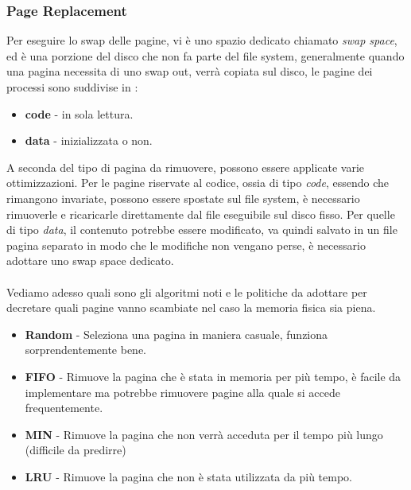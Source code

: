 \documentclass[12pt, letterpaper]{article}
\newcommand{\acc}{\\\hphantom{}\\}
\begin{document}
\subsubsection{Page Replacement} 
Per  eseguire lo swap delle pagine, vi è uno spazio dedicato chiamato \textit{swap space}, ed è una porzione del disco 
che non fa parte del file system, generalmente quando una pagina necessita di uno swap out, verrà copiata sul disco, le 
pagine dei processi sono suddivise in :\begin{itemize}
    \item \textbf{code} - in sola lettura.
    \item \textbf{data} - inizializzata o non.
\end{itemize}
A seconda del tipo di pagina da rimuovere, possono essere applicate varie ottimizzazioni. Per le pagine riservate al 
codice, ossia di tipo \textit{code}, essendo che rimangono invariate, possono essere spostate sul file system, è necessario 
rimuoverle e ricaricarle direttamente dal file eseguibile sul disco fisso. Per quelle di tipo \textit{data}, il contenuto 
potrebbe essere modificato, va quindi salvato in un file pagina separato in modo che le modifiche non vengano perse, è 
necessario adottare uno swap space dedicato. \acc 
Vediamo adesso quali sono gli algoritmi noti e le politiche da adottare per decretare quali pagine vanno scambiate nel caso 
la memoria fisica sia piena.\begin{itemize}
    \item \textbf{Random} - Seleziona una pagina in maniera casuale, funziona sorprendentemente bene.
    \item \textbf{FIFO} - Rimuove la pagina che è stata in memoria per più tempo, è facile da implementare ma potrebbe 
    rimuovere pagine alla quale si accede frequentemente.
    \item \textbf{MIN} - Rimuove la pagina che non verrà acceduta per il tempo più lungo (difficile da predirre)
    \item \textbf{LRU} - Rimuove la pagina che non è stata utilizzata da più tempo.
\end{itemize}
\end{document}
